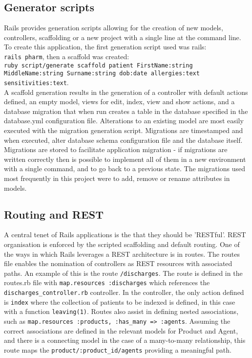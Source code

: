 \documentclass[letterpaper]{amsart}
\begin{document}
\subsection{Generator scripts}
Rails provides generation scripts allowing for the creation of new models, controllers, scaffolding or a new project with a single line at the command line.  To create this application, the first generation script used was rails:\\
\texttt{rails pharm}, then a scaffold was created:\\ \texttt{ruby script/generate scaffold patient FirstName:string MiddleName:string Surname:string dob:date allergies:text sensitivities:text}. \\
A scaffold generation results in the generation of a controller with default actions defined, an empty model, views for edit, index, view and show actions, and a database migration that when run creates a table in the database specified in the database.yml configuration file.   
Alterations to an existing model are most easily executed with the migration generation script.  Migrations are timestamped and when executed, alter database schema configuration file and the database itself.  Migrations are stored to facilitate application migration - if migrations are written correctly then is possible to implement all of them in a new environment with a single command, and to go back to a previous state.
The migrations used most frequently in this project were to add, remove or rename attributes in models.  
\subsection{Routing and REST}
A central tenet of Rails applications is the that they should be 'RESTful'.  REST organisation is enforced by the scripted scaffolding and default routing.
One of the ways in which Rails leverages a REST architecture is in routes.  The routes file enables the nomination of controllers as REST resources with associated paths.  An example of this is the route \texttt{/discharges}.  The route is defined in the routes.rb file with \texttt{map.resources :discharges} which references the \texttt{discharges\_controller.rb} controller.  In the controller, the only action defined is \texttt{index} where the collection of patients to be indexed is defined, in this case with a function \texttt{leaving(1)}.  Routes also assist in defining nested associations, such as \texttt{map.resources :products, :has\_many => :agents}.  Assuming the correct associations are defined in the relevant models for Product and Agent, and there is a connecting model in the case of a many-to-many relationship, this route maps the \texttt{product/:product\_id/agents} providing a meaningful path.
  
\end{document}
